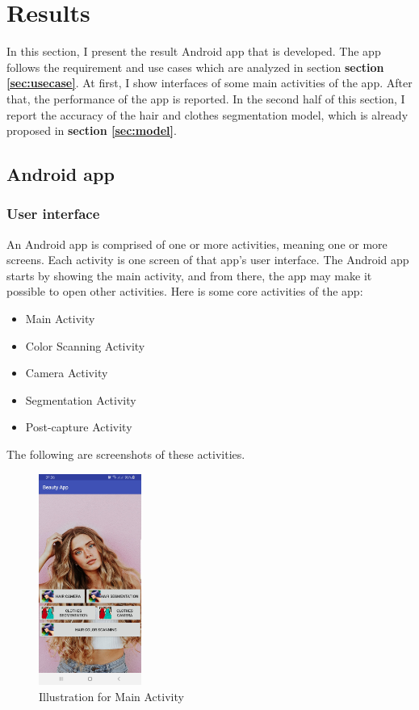 \section{Results} \label{sec:results}
In this section, I present the result Android app that is developed. The app follows the requirement and use cases which are analyzed in section \textbf{section \ref{sec:usecase}}. At first, I show interfaces of some main activities of the app. After that, the performance of the app is reported. In the second half of this section, I report the accuracy of the hair and clothes segmentation model, which is already proposed in \textbf{section \ref{sec:model}}. 

\subsection{Android app}
\subsubsection{User interface}
An Android app is comprised of one or more activities, meaning one or more screens. Each activity is one screen of that app's user interface. The Android app starts by showing the main activity, and from there, the app may make it possible to open other activities. Here is some core activities of the app:
\begin{itemize}
    \item Main Activity
    \item Color Scanning Activity
    \item Camera Activity
    \item Segmentation Activity
    \item Post-capture Activity
\end{itemize}
The following are screenshots of these activities.

\begin{figure} [H]
    \centering
    \captionsetup{justification=centering}
    \includegraphics[width=0.3\textwidth]{chapter4/image/home.jpg}
    \caption{Illustration for Main Activity}
\end{figure}

